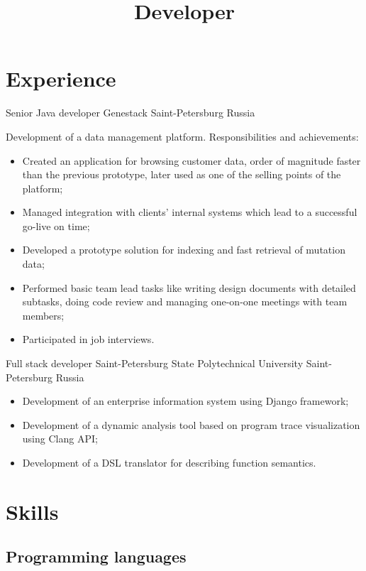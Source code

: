 \documentclass{moderncv}
\title{Developer}
\begin{document}
\makecvtitle

\section{Experience}

        {Senior Java developer}
        {Genestack}
        {Saint-Petersburg}
        {Russia}
        {Development of a data management platform. \newline{} Responsibilities and achievements:
        \begin{itemize}
            \item Created an application for browsing customer data, order of magnitude faster than the previous prototype, later
            used as one of the selling points of the platform;
            \item Managed integration with clients' internal systems which lead to a successful go-live on time;
            \item Developed a prototype solution for indexing and fast retrieval of mutation data;
            \item Performed basic team lead tasks like writing design documents with detailed subtasks, doing code review 
            and managing one-on-one meetings with team members;   
            \item Participated in job interviews.
        \end{itemize}}

        {Full stack developer}
        {Saint-Petersburg State Polytechnical University}
        {Saint-Petersburg}
        {Russia}
        {\begin{itemize}
            \item Development of an enterprise information system using Django framework;
            \item Development of a dynamic analysis tool based on program trace visualization using Clang API;
            \item Development of a DSL translator for describing function semantics.
        \end{itemize}}

\section{Skills}

\subsection{Programming languages}
\end{document}
